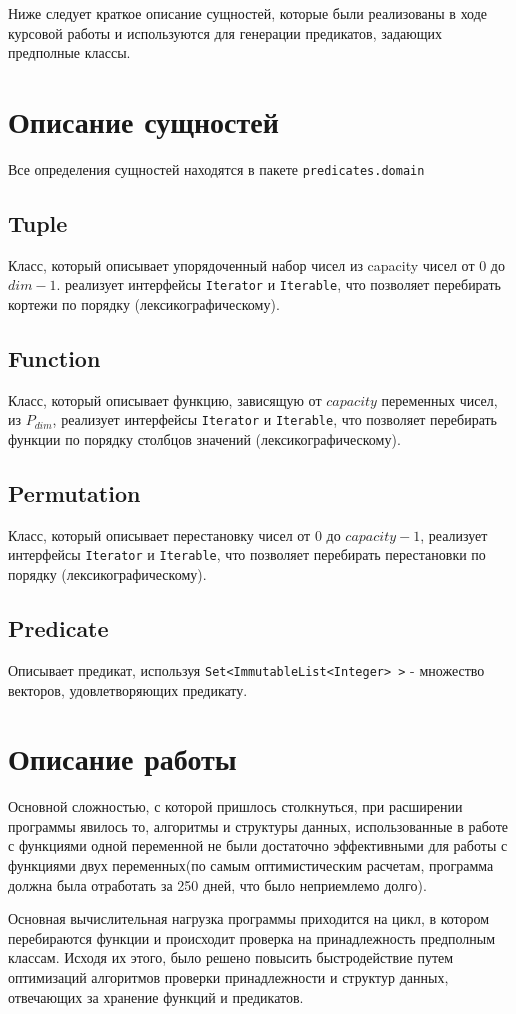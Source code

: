 \documentclass[a4paper,14pt]{extreport}
\begin{document}
Ниже следует краткое описание сущностей, которые были реализованы в ходе курсовой работы и используются для генерации предикатов, задающих предполные классы.

\section{Описание сущностей}
Все определения сущностей находятся в пакете {\tt predicates.domain}
\subsection{Tuple}
Класс, который описывает упорядоченный набор чисел из capacity чисел от $0$ до $dim-1$. реализует интерфейсы {\tt Iterator} и {\tt Iterable}, что позволяет перебирать кортежи по порядку (лексикографическому).
\subsection{Function}
Класс, который описывает функцию, зависящую от $capacity$ переменных чисел, из $P_{dim}$, реализует интерфейсы {\tt Iterator} и {\tt Iterable}, что позволяет перебирать функции по порядку столбцов значений (лексикографическому).
\subsection{Permutation}
Класс, который описывает перестановку чисел от $0$ до $capacity-1$, реализует интерфейсы {\tt Iterator} и {\tt Iterable}, что позволяет перебирать перестановки по порядку (лексикографическому).
\subsection{Predicate} 
Описывает предикат, используя {\tt Set<ImmutableList<Integer> >} - множество векторов, удовлетворяющих предикату.

\section{Описание работы}
Основной сложностью, с которой пришлось столкнуться, при расширении программы явилось то, алгоритмы и структуры данных, использованные в работе с функциями одной переменной не были достаточно эффективными для работы с функциями двух переменных(по самым оптимистическим расчетам, программа должна была отработать за 250 дней, что было неприемлемо долго). 

Основная вычислительная нагрузка программы приходится на цикл, в котором перебираются функции и происходит проверка на принадлежность предполным классам. Исходя их этого, было решено повысить быстродействие путем оптимизаций алгоритмов проверки принадлежности и структур данных, отвечающих за хранение функций и предикатов.
\end{document}
